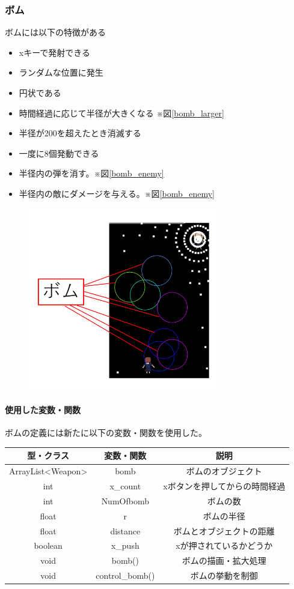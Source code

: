 \documentclass[a4paper,titlepage,11pt]{ltjsarticle}
\begin{document}
\subsubsection{ボム}
ボムには以下の特徴がある
\begin{itemize}
	\item xキーで発射できる
	\item ランダムな位置に発生
	\item 円状である
	\item 時間経過に応じて半径が大きくなる ※図\ref{bomb_larger}
	\item 半径が200を超えたとき消滅する
	\item 一度に8個発動できる
	\item 半径内の弾を消す。※図\ref{bomb_enemy}
	\item 半径内の敵にダメージを与える。※図\ref{bomb_enemy}
\end{itemize}
\begin{figure}[H]
\begin{center}
\includegraphics*[height = 8cm]{bomb_game.png}
\caption{}
\end{center}
\end{figure}

\paragraph{使用した変数・関数}
ボムの定義には新たに以下の変数・関数を使用した。
\begin{table}[H]
	\centering
	\begin{tabular}{|c|c|c|}
		\hline
		型・クラス & 変数・関数 & 説明\\ \hline \hline
		ArrayList<Weapon> & bomb & ボムのオブジェクト \\ \hline
		int & x\_count & xボタンを押してからの時間経過 \\ \hline
		int & NumOfbomb & ボムの数 \\ \hline
		float & r & ボムの半径 \\ \hline
		float & distance & ボムとオブジェクトの距離 \\ \hline
		boolean & x\_push & xが押されているかどうか \\ \hline
		void & bomb() & ボムの描画・拡大処理 \\ \hline
		void & control\_bomb()&ボムの挙動を制御 \\ \hline
	\end{tabular}
\end{table}
\end{document}
